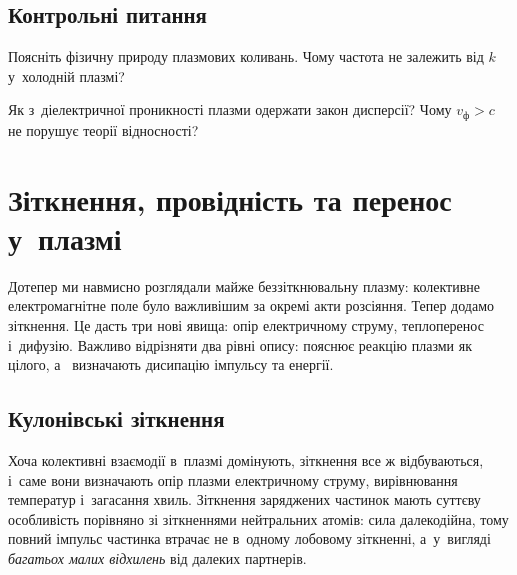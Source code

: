 \section*{Контрольні питання}

\begin{Questions}
\begin{quizlist}
\item Поясніть фізичну природу плазмових коливань. Чому частота не залежить від
		  $k$ у~холодній плазмі?

\item Як з~діелектричної проникності плазми одержати закон дисперсії? Чому
		  $v_{\mathrm{ф}}>c$ не порушує теорії відносності?

\end{quizlist}
\end{Questions}

\chapter{Зіткнення, провідність та перенос у~плазмі}\label{sec:plasma-collisions}\hypertarget{plasma-collisions}{}

Дотепер ми навмисно розглядали майже беззіткнювальну плазму: колективне електромагнітне
поле було важливішим за окремі акти розсіяння. Тепер додамо зіткнення. Це дасть три нові
явища: опір електричному струму, теплоперенос і~дифузію. Важливо відрізняти два рівні
опису:  пояснює реакцію плазми як цілого, а~
визначають дисипацію імпульсу та енергії.



\section{Кулонівські зіткнення}



Хоча колективні взаємодії в~плазмі домінують, зіткнення все ж відбуваються, і~саме вони
визначають опір плазми електричному струму, вирівнювання температур і~загасання хвиль.
Зіткнення заряджених частинок мають суттєву особливість порівняно зі зіткненнями
нейтральних атомів: сила далекодійна, тому повний імпульс частинка втрачає не в~одному
лобовому зіткненні, а~у~вигляді \emph{багатьох малих відхилень} від далеких партнерів.

